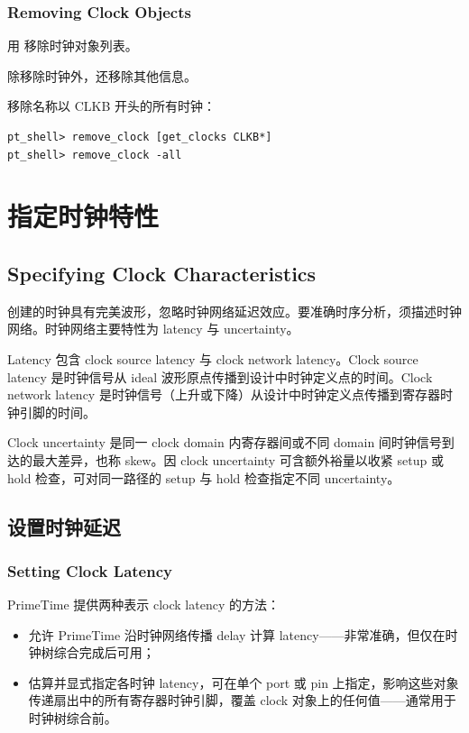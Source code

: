 \subsubsection*{Removing Clock Objects}

用  移除时钟对象列表。

\begin{noteBox}
 除移除时钟外，还移除其他信息。
\end{noteBox}

移除名称以 CLKB 开头的所有时钟：
\begin{lstlisting}
pt_shell> remove_clock [get_clocks CLKB*]
pt_shell> remove_clock -all
\end{lstlisting}


\section{指定时钟特性}
\subsection*{Specifying Clock Characteristics}

 创建的时钟具有完美波形，忽略时钟网络延迟效应。要准确时序分析，须描述时钟网络。时钟网络主要特性为 latency 与 uncertainty。

Latency 包含 clock source latency 与 clock network latency。Clock source latency 是时钟信号从 ideal 波形原点传播到设计中时钟定义点的时间。Clock network latency 是时钟信号（上升或下降）从设计中时钟定义点传播到寄存器时钟引脚的时间。

Clock uncertainty 是同一 clock domain 内寄存器间或不同 domain 间时钟信号到达的最大差异，也称 skew。因 clock uncertainty 可含额外裕量以收紧 setup 或 hold 检查，可对同一路径的 setup 与 hold 检查指定不同 uncertainty。

\subsection{设置时钟延迟}
\subsubsection*{Setting Clock Latency}

PrimeTime 提供两种表示 clock latency 的方法：
\begin{itemize}
  \item 允许 PrimeTime 沿时钟网络传播 delay 计算 latency——非常准确，但仅在时钟树综合完成后可用；
  \item 估算并显式指定各时钟 latency，可在单个 port 或 pin 上指定，影响这些对象传递扇出中的所有寄存器时钟引脚，覆盖 clock 对象上的任何值——通常用于时钟树综合前。
\end{itemize}

